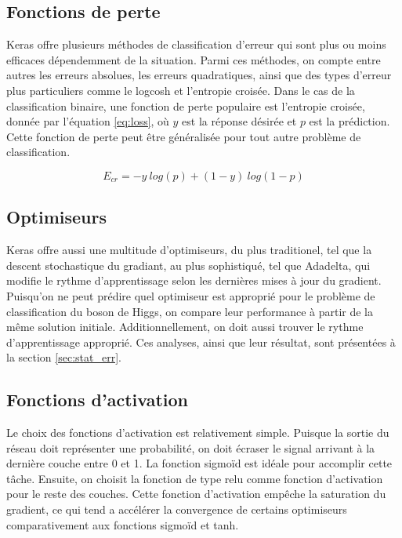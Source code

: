 \documentclass{article}
\begin{document}
\subsection{Fonctions de perte}

Keras offre plusieurs méthodes de classification d'erreur qui sont plus ou moins efficaces dépendemment de la situation. Parmi ces méthodes, on compte entre autres les erreurs absolues, les erreurs quadratiques, ainsi que des types d'erreur plus particuliers comme le logcosh et l'entropie croisée. Dans le cas de la classification binaire, une fonction de perte populaire est l'entropie croisée, donnée par l'équation \ref{eq:loss}, où $y$ est la réponse désirée et $p$ est la prédiction. Cette fonction de perte peut être généralisée pour tout autre problème de classification.

\begin{equation}\label{eq:loss}
	E_{cr} = -y\ log(p) + (1-y)\ log(1-p)
\end{equation}

\subsection{Optimiseurs}

Keras offre aussi une multitude d'optimiseurs, du plus traditionel, tel que la descent stochastique du gradiant,  au plus sophistiqué, tel que Adadelta, qui modifie le rythme d'apprentissage selon les dernières mises à jour du gradient. Puisqu'on ne peut prédire quel optimiseur est approprié pour le problème de classification du boson de Higgs, on compare leur performance à partir de la même solution initiale. Additionnellement, on doit aussi trouver le rythme d'apprentissage approprié. Ces analyses, ainsi que leur résultat, sont présentées à la section \ref{sec:stat_err}.

\subsection{Fonctions d'activation}

Le choix des fonctions d'activation est relativement simple. Puisque la sortie du réseau doit représenter une probabilité, on doit écraser le signal arrivant à la dernière couche entre 0 et 1. La fonction sigmoïd est idéale pour accomplir cette tâche. Ensuite, on choisit la fonction de type relu comme fonction d'activation pour le reste des couches. Cette fonction d'activation empêche la saturation du gradient, ce qui tend a accélérer la convergence de certains optimiseurs comparativement aux fonctions sigmoïd et tanh.
\end{document}
